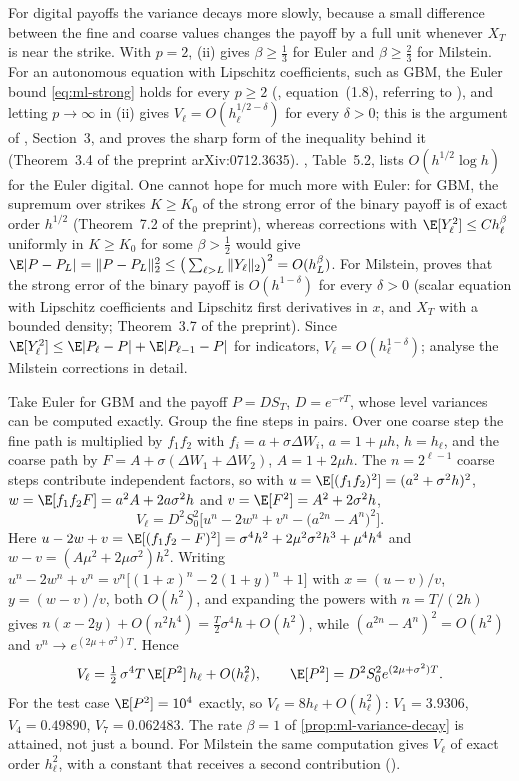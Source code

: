 For digital payoffs the variance decays more slowly, because a small difference between the fine
and coarse values changes the payoff by a full unit whenever $X_T$ is near the strike. With $p=2$,
(ii) gives $\beta\ge\frac13$ for Euler and $\beta\ge\frac23$ for Milstein. For an autonomous
equation with Lipschitz coefficients, such as GBM, the Euler bound \eqref{eq:ml-strong} holds for
every $p\ge2$
(\citealp{giles-higham-mao}, equation~(1.8), referring to \citealp{kloeden-platen}), and letting
$p\to\infty$ in (ii) gives $V_\ell=O(h_\ell^{1/2-\delta})$ for every $\delta>0$; this is the
argument of \textcite{giles-higham-mao}, Section~3, and \textcite{avikainen} proves the sharp form
of the inequality behind it (Theorem~3.4 of the preprint arXiv:0712.3635). ,
Table~5.2, lists $O(h^{1/2}\log h)$ for the Euler digital. One cannot hope for much more with Euler:
for GBM, the supremum over strikes $K\ge K_0$ of the strong error of the binary payoff is of exact
order $h^{1/2}$ (Theorem~7.2 of the preprint), whereas corrections with $\E[Y_\ell^2]\le Ch_\ell^\beta$
uniformly in $K\ge K_0$ for some $\beta>\frac12$ would give
$\E|P-P_L|=\|P-P_L\|_2^2\le\big(\sum_{\ell>L}\|Y_\ell\|_2\big)^2=O(h_L^\beta)$. For Milstein,
\textcite{avikainen} proves that the strong error of the binary payoff is $O(h^{1-\delta})$ for every
$\delta>0$ (scalar equation with Lipschitz coefficients and Lipschitz first derivatives in $x$, and
$X_T$ with a bounded density; Theorem~3.7 of the preprint). Since
$\E[Y_\ell^2]\le\E|P_\ell-P|+\E|P_{\ell-1}-P|$ for indicators, $V_\ell=O(h_\ell^{1-\delta})$;
\textcite{giles-debrabant-rossler} analyse the Milstein corrections in detail.

\begin{example}\label{exa:ml-gbm-exact}
Take Euler for GBM and the payoff $P=DS_T$, $D=e^{-rT}$, whose level variances can be computed
exactly. Group the fine steps in pairs. Over one coarse step the fine path is multiplied by
$f_1f_2$ with $f_i=a+\sigma\Delta W_i$, $a=1+\mu h$, $h=h_\ell$, and the coarse path by
$F=A+\sigma(\Delta W_1+\Delta W_2)$, $A=1+2\mu h$. The $n=2^{\ell-1}$ coarse steps contribute
independent factors, so with $u=\E[(f_1f_2)^2]=(a^2+\sigma^2h)^2$,
$w=\E[f_1f_2F]=a^2A+2a\sigma^2h$ and $v=\E[F^2]=A^2+2\sigma^2h$,
\[
  V_\ell=D^2S_0^2\Big[u^n-2w^n+v^n-\big(a^{2n}-A^n\big)^2\Big].
\]
Here $u-2w+v=\E[(f_1f_2-F)^2]=\sigma^4h^2+2\mu^2\sigma^2h^3+\mu^4h^4$ and
$w-v=(A\mu^2+2\mu\sigma^2)h^2$. Writing $u^n-2w^n+v^n=v^n\big[(1+x)^n-2(1+y)^n+1\big]$ with
$x=(u-v)/v$, $y=(w-v)/v$, both $O(h^2)$, and expanding the powers with $n=T/(2h)$ gives
$n(x-2y)+O(n^2h^4)=\frac T2\sigma^4h+O(h^2)$, while $(a^{2n}-A^n)^2=O(h^2)$ and
$v^n\to e^{(2\mu+\sigma^2)T}$. Hence
\[
  V_\ell=\tfrac12\,\sigma^4T\,\E[P^2]\,h_\ell+O(h_\ell^2),\qquad \E[P^2]=D^2S_0^2e^{(2\mu+\sigma^2)T}.
\]
For the test case $\E[P^2]=10^4$ exactly, so $V_\ell=8h_\ell+O(h_\ell^2)$: $V_1=3.9306$,
$V_4=0.49890$, $V_7=0.062483$. The rate $\beta=1$ of \cref{prop:ml-variance-decay} is attained,
not just a bound. For Milstein the same computation gives $V_\ell$ of exact order $h_\ell^2$,
with a constant that receives a second contribution ().
\end{example}

